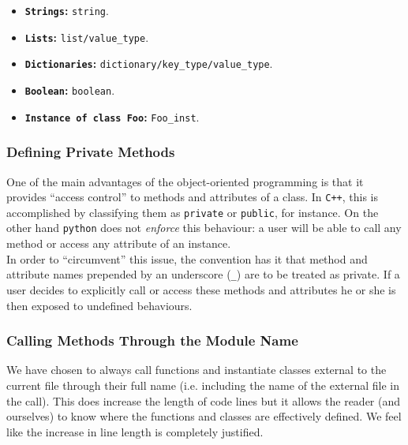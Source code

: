                 \begin{itemize}
                    \item \textbf{\texttt{Strings}:} \texttt{string}.
                    \item \textbf{\texttt{Lists}:} \texttt{list/value\_type}.
                    \item \textbf{\texttt{Dictionaries}:} \texttt{dictionary/key\_type/value\_type}.
                    \item \textbf{\texttt{Boolean}:} \texttt{boolean}.
                    \item \textbf{\texttt{Instance of class Foo}:} \texttt{Foo\_inst}.
                \end{itemize}

            \subsubsection{Defining Private Methods}
                One of the main advantages of the object-oriented programming is that it provides ``access control'' to methods and attributes of a class. In \texttt{C++}, this is accomplished by classifying them as \texttt{private} or \texttt{public}, for instance. On the other hand \texttt{python} does not \textit{enforce} this behaviour: a user will be able to call any method or access any attribute of an instance.\\

                In order to ``circumvent'' this issue, the convention has it that method and attribute names prepended by an underscore (\texttt{\_}) are to be treated as private. If a user decides to explicitly call or access these methods and attributes he or she is then exposed to undefined behaviours.\\

            \subsubsection{Calling Methods Through the Module Name}
                We have chosen to always call functions and instantiate classes external to the current file through their full name (i.e. including the name of the external file in the call). This does increase the length of code lines but it allows the reader (and ourselves) to know where the functions and classes are effectively defined. We feel like the increase in line length is completely justified.\\


